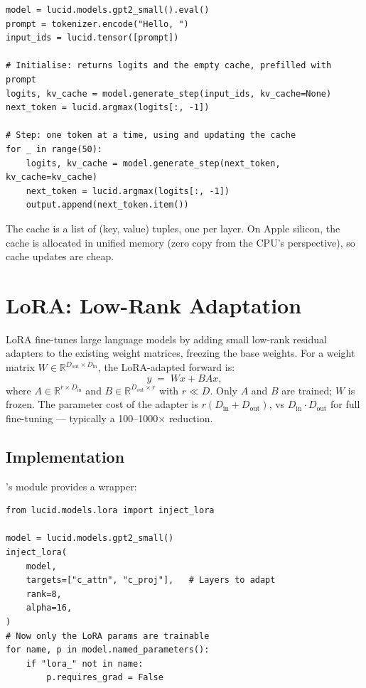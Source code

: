 \begin{lstlisting}[style=lucid,language=LucidPython]
model = lucid.models.gpt2_small().eval()
prompt = tokenizer.encode("Hello, ")
input_ids = lucid.tensor([prompt])

# Initialise: returns logits and the empty cache, prefilled with prompt
logits, kv_cache = model.generate_step(input_ids, kv_cache=None)
next_token = lucid.argmax(logits[:, -1])

# Step: one token at a time, using and updating the cache
for _ in range(50):
    logits, kv_cache = model.generate_step(next_token, kv_cache=kv_cache)
    next_token = lucid.argmax(logits[:, -1])
    output.append(next_token.item())
\end{lstlisting}

The cache is a list of (key, value) tuples, one per layer. On
Apple silicon, the cache is allocated in unified memory (zero
copy from the CPU's perspective), so cache updates are cheap.

\section{LoRA: Low-Rank Adaptation}
\label{sec:language_models:lora}

LoRA \cite{hu_lora_2021} fine-tunes large language models by
adding small low-rank residual adapters to the existing
weight matrices, freezing the base weights. For a weight matrix
$W \in \mathbb{R}^{D_{\text{out}} \times D_{\text{in}}}$, the
LoRA-adapted forward is:
\[
  y \;=\; W x + B A x,
\]
where $A \in \mathbb{R}^{r \times D_{\text{in}}}$ and
$B \in \mathbb{R}^{D_{\text{out}} \times r}$ with $r \ll D$.
Only $A$ and $B$ are trained; $W$ is frozen. The parameter cost
of the adapter is $r(D_{\text{in}} + D_{\text{out}})$, vs
$D_{\text{in}} \cdot D_{\text{out}}$ for full fine-tuning ---
typically a 100--1000$\times$ reduction.

\subsection{Implementation}
\label{ssec:language_models:lora_impl}

\Lucid's  module provides a wrapper:

\begin{lstlisting}[style=lucid,language=LucidPython]
from lucid.models.lora import inject_lora

model = lucid.models.gpt2_small()
inject_lora(
    model,
    targets=["c_attn", "c_proj"],   # Layers to adapt
    rank=8,
    alpha=16,
)
# Now only the LoRA params are trainable
for name, p in model.named_parameters():
    if "lora_" not in name:
        p.requires_grad = False
\end{lstlisting}


